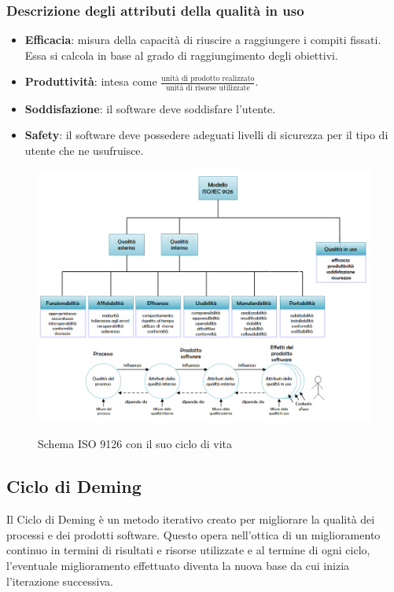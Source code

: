 		\subsubsection{Descrizione degli attributi della qualità in uso}
		\begin{itemize}
			\item \textbf{Efficacia}: misura della capacità di riuscire a raggiungere i compiti fissati. Essa si calcola in base al grado di raggiungimento degli obiettivi.
			\item \textbf{Produttività}: intesa come $ \frac{\text{unità di prodotto realizzato}}{\text{unità di risorse utilizzate}} $.
			\item \textbf{Soddisfazione}: il software deve soddisfare l'utente.
			\item \textbf{Safety}: il software deve possedere adeguati livelli di sicurezza per il tipo di utente che ne usufruisce.
		\end{itemize}
	
	\begin{figure}[H]
		\includegraphics[width=\textwidth]{img/ISO9126_full.png}
		\label{fig:iso9126}
		\caption[Schema ISO 9126 con il suo ciclo di vita]{Schema ISO 9126 con il suo ciclo di vita\protect\footnotemark}
	\end{figure}

	
	\subsection{Ciclo di Deming}	\label{cicloDeming}
	Il Ciclo di Deming è un metodo iterativo creato per migliorare la qualità dei processi e dei prodotti software. Questo opera nell'ottica di un miglioramento continuo in termini di risultati e risorse utilizzate e al termine di ogni ciclo, l'eventuale miglioramento effettuato diventa la nuova base da cui inizia l'iterazione successiva.
	
